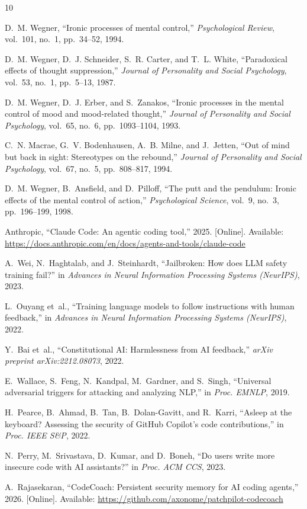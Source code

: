 \documentclass[conference,10pt]{IEEEtran}
\begin{document}

\begin{thebibliography}{10}

D.~M. Wegner, ``Ironic processes of mental control,'' \textit{Psychological Review}, vol.~101, no.~1, pp.~34--52, 1994.

D.~M. Wegner, D.~J. Schneider, S.~R. Carter, and T.~L. White, ``Paradoxical effects of thought suppression,'' \textit{Journal of Personality and Social Psychology}, vol.~53, no.~1, pp.~5--13, 1987.

D.~M. Wegner, D.~J. Erber, and S.~Zanakos, ``Ironic processes in the mental control of mood and mood-related thought,'' \textit{Journal of Personality and Social Psychology}, vol.~65, no.~6, pp.~1093--1104, 1993.

C.~N. Macrae, G.~V. Bodenhausen, A.~B. Milne, and J.~Jetten, ``Out of mind but back in sight: Stereotypes on the rebound,'' \textit{Journal of Personality and Social Psychology}, vol.~67, no.~5, pp.~808--817, 1994.

D.~M. Wegner, B.~Ansfield, and D.~Pilloff, ``The putt and the pendulum: Ironic effects of the mental control of action,'' \textit{Psychological Science}, vol.~9, no.~3, pp.~196--199, 1998.

Anthropic, ``Claude Code: An agentic coding tool,'' 2025. [Online]. Available: \url{https://docs.anthropic.com/en/docs/agents-and-tools/claude-code}

A.~Wei, N.~Haghtalab, and J.~Steinhardt, ``Jailbroken: How does LLM safety training fail?'' in \textit{Advances in Neural Information Processing Systems (NeurIPS)}, 2023.

L.~Ouyang et~al., ``Training language models to follow instructions with human feedback,'' in \textit{Advances in Neural Information Processing Systems (NeurIPS)}, 2022.

Y.~Bai et~al., ``Constitutional AI: Harmlessness from AI feedback,'' \textit{arXiv preprint arXiv:2212.08073}, 2022.

E.~Wallace, S.~Feng, N.~Kandpal, M.~Gardner, and S.~Singh, ``Universal adversarial triggers for attacking and analyzing NLP,'' in \textit{Proc. EMNLP}, 2019.

H.~Pearce, B.~Ahmad, B.~Tan, B.~Dolan-Gavitt, and R.~Karri, ``Asleep at the keyboard? Assessing the security of GitHub Copilot's code contributions,'' in \textit{Proc. IEEE S\&P}, 2022.

N.~Perry, M.~Srivastava, D.~Kumar, and D.~Boneh, ``Do users write more insecure code with AI assistants?'' in \textit{Proc. ACM CCS}, 2023.

A.~Rajasekaran, ``CodeCoach: Persistent security memory for AI coding agents,'' 2026. [Online]. Available: \url{https://github.com/axonome/patchpilot-codecoach}

\end{thebibliography}
\end{document}
